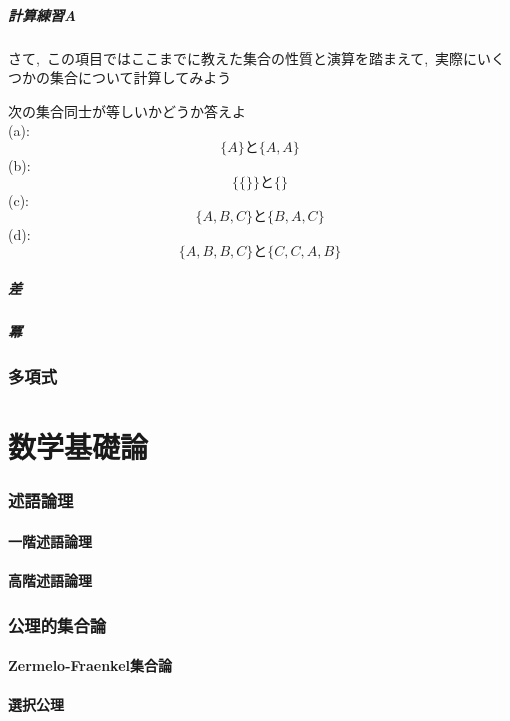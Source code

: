 \documentclass[hyperref,a4paper,12pt]{kininaruki}
\begin{document}
\subsubsection*{計算練習A}
さて,\, この項目ではここまでに教えた集合の性質と演算を踏まえて,\, 実際にいくつかの集合について計算してみよう

\begin{multicols}{2}
    \noindent
     次の集合同士が等しいかどうか答えよ\\
    (a):$$\{A\}\text{と}\{A,A\}$$
    \noindent
    (b):$$\{\{\}\}\text{と}\{\}$$
    \noindent
    (c):$$\{A,B,C\}\text{と}\{B,A,C\}$$
    \noindent
    (d):$$\{A,B,B,C\}\text{と}\{C,C,A,B\}$$
\end{multicols}
\newpage
\subsubsection{差}
\subsubsection{冪}
\newpage
\section{多項式}
\newpage
\part{数学基礎論}
\section{述語論理}
\newpage
\subsection{一階述語論理}
\newpage
\subsection{高階述語論理}
\newpage
\section{公理的集合論}
\newpage
\subsection{Zermelo-Fraenkel集合論}
\newpage
\subsection{選択公理}
\newpage
\end{document}
